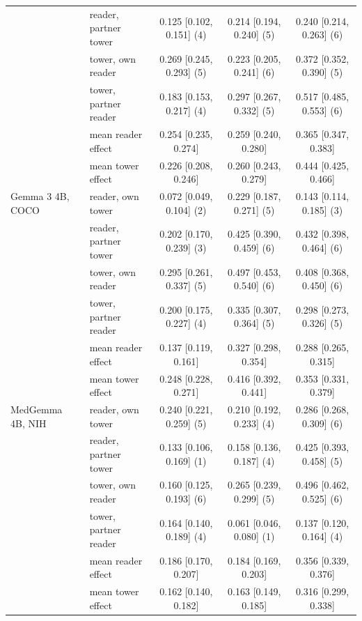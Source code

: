 \documentclass{article}
\providecommand{\DIFaddendFL}{} %
\DeclareRobustCommand{\DIFaddendFL}{\DIFOaddendFL \let\includegraphics\DIFOincludegraphics} %
\begin{document}
\begin{table}[htbp]
{\begin{tabular}{llccc}
 & reader, partner tower & 0.125 [0.102, 0.151] (4) & 0.214 [0.194, 0.240] (5) & 0.240 [0.214, 0.263] (6) \\
 & tower, own reader & 0.269 [0.245, 0.293] (5) & 0.223 [0.205, 0.241] (6) & 0.372 [0.352, 0.390] (5) \\
 & tower, partner reader & 0.183 [0.153, 0.217] (4) & 0.297 [0.267, 0.332] (5) & 0.517 [0.485, 0.553] (6) \\
 & \quad mean reader effect & 0.254 [0.235, 0.274] & 0.259 [0.240, 0.280] & 0.365 [0.347, 0.383] \\
 & \quad mean tower effect & 0.226 [0.208, 0.246] & 0.260 [0.243, 0.279] & 0.444 [0.425, 0.466] \\
\addlinespace
Gemma 3 4B, COCO & reader, own tower & 0.072 [0.049, 0.104] (2) & 0.229 [0.187, 0.271] (5) & 0.143 [0.114, 0.185] (3) \\
 & reader, partner tower & 0.202 [0.170, 0.239] (3) & 0.425 [0.390, 0.459] (6) & 0.432 [0.398, 0.464] (6) \\
 & tower, own reader & 0.295 [0.261, 0.337] (5) & 0.497 [0.453, 0.540] (6) & 0.408 [0.368, 0.450] (6) \\
 & tower, partner reader & 0.200 [0.175, 0.227] (4) & 0.335 [0.307, 0.364] (5) & 0.298 [0.273, 0.326] (5) \\
 & \quad mean reader effect & 0.137 [0.119, 0.161] & 0.327 [0.298, 0.354] & 0.288 [0.265, 0.315] \\
 & \quad mean tower effect & 0.248 [0.228, 0.271] & 0.416 [0.392, 0.441] & 0.353 [0.331, 0.379] \\
\addlinespace
MedGemma 4B, NIH & reader, own tower & 0.240 [0.221, 0.259] (5) & 0.210 [0.192, 0.233] (4) & 0.286 [0.268, 0.309] (6) \\
 & reader, partner tower & 0.133 [0.106, 0.169] (1) & 0.158 [0.136, 0.187] (4) & 0.425 [0.393, 0.458] (5) \\
 & tower, own reader & 0.160 [0.125, 0.193] (6) & 0.265 [0.239, 0.299] (5) & 0.496 [0.462, 0.525] (6) \\
 & tower, partner reader & 0.164 [0.140, 0.189] (4) & 0.061 [0.046, 0.080] (1) & 0.137 [0.120, 0.164] (4) \\
 & \quad mean reader effect & 0.186 [0.170, 0.207] & 0.184 [0.169, 0.203] & 0.356 [0.339, 0.376] \\
 & \quad mean tower effect & 0.162 [0.140, 0.182] & 0.163 [0.149, 0.185] & 0.316 [0.299, 0.338] \\
\bottomrule
\end{tabular}}
\DIFaddendFL \end{table}
\end{document}
